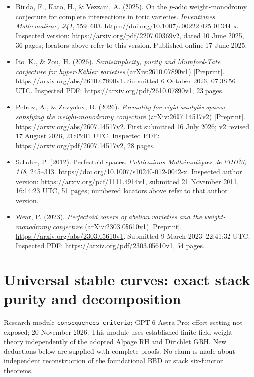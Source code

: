 \documentclass[11pt,a4paper]{article}
\providecommand{\tightlist}{\setlength{\itemsep}{0pt}\setlength{\parskip}{0pt}}
\theoremstyle{definition}\newtheorem{definition}[theorem]{Definition}
\theoremstyle{remark}\newtheorem{remark}[theorem]{Remark}
\begin{document}
\begin{itemize}
\tightlist
\item
  Binda, F., Kato, H., \& Vezzani, A. (2025). On the \(p\)-adic
  weight-monodromy conjecture for complete intersections in toric
  varieties. \emph{Inventiones Mathematicae, 241}, 559--603.
  \url{https://doi.org/10.1007/s00222-025-01344-x}. Inspected version:
  \url{https://arxiv.org/pdf/2207.00369v2,} dated 10 June 2025, 36 pages;
  locators above refer to this version. Published online 17 June 2025.
\item
  Ito, K., \& Zou, H. (2026). \emph{Semisimplicity, purity and
  Mumford-Tate conjecture for hyper-Kähler varieties}
  (arXiv:2610.07890v1) {[}Preprint{]}.
  \url{https://arxiv.org/abs/2610.07890v1}. Submitted 6 October 2026, 07:38:56
  UTC. Inspected PDF: \url{https://arxiv.org/pdf/2610.07890v1,} 23 pages.
\item
  Petrov, A., \& Zavyalov, B. (2026). \emph{Formality for rigid-analytic
  spaces satisfying the weight-monodromy conjecture}
  (arXiv:2607.14517v2) {[}Preprint{]}.
  \url{https://arxiv.org/abs/2607.14517v2}. First submitted 16 July 2026; v2
  revised 17 August 2026, 21:05:01 UTC. Inspected PDF:
  \url{https://arxiv.org/pdf/2607.14517v2,} 28 pages.
\item
  Scholze, P. (2012). Perfectoid spaces. \emph{Publications
  Mathématiques de l'IHÉS, 116}, 245--313.
  \url{https://doi.org/10.1007/s10240-012-0042-x}. Inspected author version:
  \url{https://arxiv.org/pdf/1111.4914v1,} submitted 21 November 2011,
  16:14:23 UTC, 51 pages; numbered locators above refer to that author
  version.
\item
  Wear, P. (2023). \emph{Perfectoid covers of abelian varieties and the
  weight-monodromy conjecture} (arXiv:2303.05610v1) {[}Preprint{]}.
  \url{https://arxiv.org/abs/2303.05610v1}. Submitted 9 March 2023, 22:41:32
  UTC. Inspected PDF: \url{https://arxiv.org/pdf/2303.05610v1,} 54 pages.
\end{itemize}


\section{Universal stable curves: exact stack purity and
decomposition}\label{universal-stable-curves-exact-stack-purity-and-decomposition}

Research module \nolinkurl{consequences_criteria}; GPT-6 Astra Pro; effort
setting not exposed; 20 November 2026. This module uses established
finite-field weight theory independently of the adopted Alpöge RH and
Dirichlet GRH. New deductions below are supplied with complete proofs.
No claim is made about independent reconstruction of the foundational
BBD or stack six-functor theorems.
\end{document}
